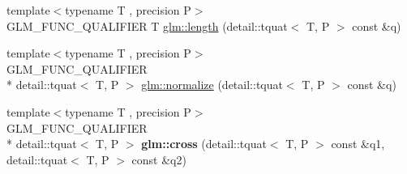 \begin{DoxyCompactItemize}
\item 
{\footnotesize template$<$typename T , precision P$>$ }\\G\-L\-M\-\_\-\-F\-U\-N\-C\-\_\-\-Q\-U\-A\-L\-I\-F\-I\-E\-R T \hyperlink{group__gtc__quaternion_ga3406ab83e2cafd4034f359957e942410}{glm\-::length} (detail\-::tquat$<$ T, P $>$ const \&q)
\item 
{\footnotesize template$<$typename T , precision P$>$ }\\G\-L\-M\-\_\-\-F\-U\-N\-C\-\_\-\-Q\-U\-A\-L\-I\-F\-I\-E\-R \\*
detail\-::tquat$<$ T, P $>$ \hyperlink{group__gtc__quaternion_ga34ee289ca53a08207904e935104715d8}{glm\-::normalize} (detail\-::tquat$<$ T, P $>$ const \&q)
\item 
\hypertarget{namespaceglm_ad70062c675bba04acb6b067c448f6b9e}{{\footnotesize template$<$typename T , precision P$>$ }\\G\-L\-M\-\_\-\-F\-U\-N\-C\-\_\-\-Q\-U\-A\-L\-I\-F\-I\-E\-R \\*
detail\-::tquat$<$ T, P $>$ {\bfseries glm\-::cross} (detail\-::tquat$<$ T, P $>$ const \&q1, detail\-::tquat$<$ T, P $>$ const \&q2)}\label{namespaceglm_ad70062c675bba04acb6b067c448f6b9e}


\end{DoxyCompactItemize}
